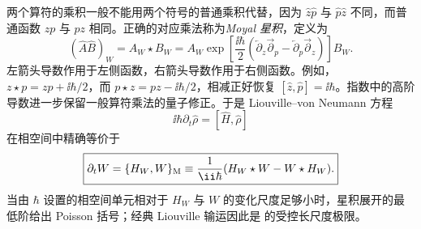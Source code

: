 两个算符的乘积一般不能用两个符号的普通乘积代替，因为 $\hat z\hat p$ 与 $\hat p\hat z$ 不同，而普通函数 $zp$ 与 $pz$ 相同。正确的对应乘法称为\emph{Moyal 星积}，定义为
\begin{equation}
\boxed{
(\hat A\hat B)_W=A_W\star B_W
=A_W\exp\!\left[
\frac{\ii\hbar}{2}
\left(
\overleftarrow\partial_z\overrightarrow\partial_p
-\overleftarrow\partial_p\overrightarrow\partial_z
\right)\right]B_W.}
\label{eq:weyl_star_product_derived}
\end{equation}
左箭头导数作用于左侧函数，右箭头导数作用于右侧函数。例如，$z\star p=zp+\ii\hbar/2$，而 $p\star z=pz-\ii\hbar/2$，相减正好恢复 $[\hat z,\hat p]=\ii\hbar$。指数中的高阶导数进一步保留一般算符乘法的量子修正。于是 Liouville--von Neumann 方程
\[
\ii\hbar\partial_t\hat\rho=[\hat H,\hat\rho]
\]
在相空间中精确等价于
\begin{equation}
\boxed{
\partial_tW=\{H_W,W\}_{\rm M}
\equiv\frac{1}{\ii\hbar}(H_W\star W-W\star H_W).}
\label{eq:moyal_general}
\end{equation}
当由 $\hbar$ 设置的相空间单元相对于 $H_W$ 与 $W$ 的变化尺度足够小时，星积展开的最低阶给出 Poisson 括号；经典 Liouville 输运因此是 的受控长尺度极限。


